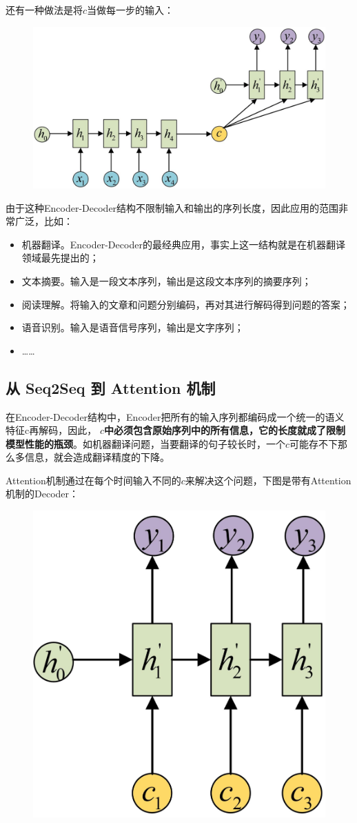 \documentclass[12pt]{article}
\begin{document}
还有一种做法是将$c$当做每一步的输入：
\begin{figure}[H]
    \centering
    \includegraphics[width=.5\textwidth]{fig/RNN_Classic_Output_Encoder_Decoder_2.jpg}
\end{figure}

由于这种Encoder-Decoder结构不限制输入和输出的序列长度，因此应用的范围非常广泛，比如：
\begin{itemize}
\setlength{\itemsep}{0pt}
\setlength{\parsep}{0pt}
\setlength{\parskip}{0pt}
    \item 机器翻译。Encoder-Decoder的最经典应用，事实上这一结构就是在机器翻译领域最先提出的；
    \item 文本摘要。输入是一段文本序列，输出是这段文本序列的摘要序列；
    \item 阅读理解。将输入的文章和问题分别编码，再对其进行解码得到问题的答案；
    \item 语音识别。输入是语音信号序列，输出是文字序列；
    \item ……
\end{itemize}

\subsection{从 Seq2Seq 到 Attention 机制}
在Encoder-Decoder结构中，Encoder把所有的输入序列都编码成一个统一的语义特征c再解码，因此， \textbf{$c$中必须包含原始序列中的所有信息，它的长度就成了限制模型性能的瓶颈}。如机器翻译问题，当要翻译的句子较长时，一个$c$可能存不下那么多信息，就会造成翻译精度的下降。

Attention机制通过在每个时间输入不同的$c$来解决这个问题，下图是带有Attention机制的Decoder：
\begin{figure}[H]
    \centering
    \includegraphics[width=.5\textwidth]{fig/Attention_Decoder_Different_C.jpg}
\end{figure}
\end{document}
